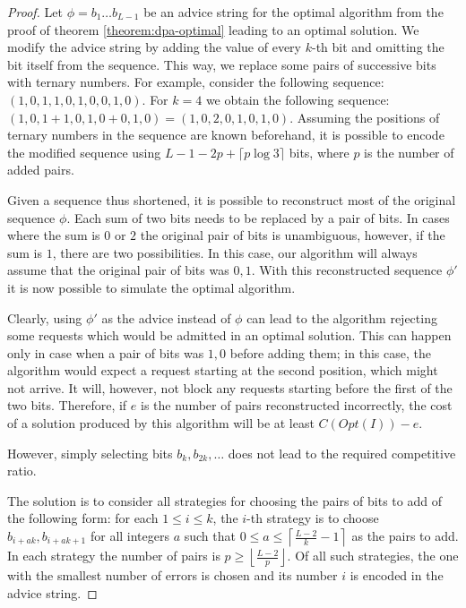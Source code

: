 \begin{proof}
    Let $\phi = b_1\dots{}b_{L-1}$ be an advice string for the optimal
    algorithm from the proof of theorem \ref{theorem:dpa-optimal} leading
    to an optimal solution. We modify the advice string by adding the
    value of every $k$-th bit and omitting the bit itself from the
    sequence. This way, we replace some pairs of successive bits with
    ternary numbers. For example, consider the following sequence:
    $(1,0,1,1,0,1,0,0,1,0)$. For $k=4$ we obtain the following sequence:
    $(1,0,1+1,0,1,0+0,1,0) = (1,0,2,0,1,0,1,0)$. Assuming the positions of
    ternary numbers in the sequence are known beforehand, it is possible
    to encode the modified sequence using $L - 1 - 2p +
    \lceil{}p\log{}3\rceil$ bits, where $p$ is the number of added pairs.

    Given a sequence thus shortened, it is possible to reconstruct most of
    the original sequence $\phi$. Each sum of two bits needs to be
    replaced by a pair of bits. In cases where the sum is $0$ or $2$ the
    original pair of bits is unambiguous, however, if the sum is $1$,
    there are two possibilities. In this case, our algorithm will always
    assume that the original pair of bits was $0, 1$. With this
    reconstructed sequence $\phi'$ it is now possible to simulate the
    optimal algorithm.

    Clearly, using $\phi'$ as the advice instead of $\phi$ can lead to the
    algorithm rejecting some requests which would be admitted in an
    optimal solution. This can happen only in case when a pair of bits was
    $1, 0$ before adding them; in this case, the algorithm would expect a
    request starting at the second position, which might not arrive. It
    will, however, not block any requests starting before the first of the
    two bits. Therefore, if $e$ is the number of pairs reconstructed
    incorrectly, the cost of a solution produced by this algorithm will be
    at least $C(Opt(I)) - e$.

    However, simply selecting bits $b_k, b_{2k}, \dots$ does not lead to
    the required competitive ratio. 

    The solution is to consider all strategies for choosing the pairs of
    bits to add of the following form: for each $1 \leq i \leq k$, the
    $i$-th strategy is to choose $b_{i+ak}, b_{i+ak+1}$ for all integers
    $a$ such that $0 \leq a \leq \left\lceil\frac{L-2}{k}-1\right\rceil$
    as the pairs to add. In each strategy the number of pairs is $p \geq
    \left\lfloor\frac{L-2}{p}\right\rfloor$. Of all such strategies, the
    one with the smallest number of errors is chosen and its number $i$ is
    encoded in the advice string.


\end{proof}
